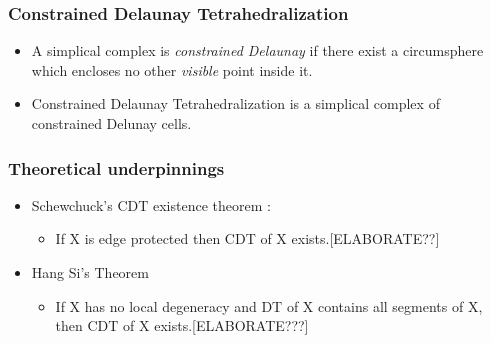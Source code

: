 \documentclass{beamer}
\begin{document}
	\begin{frame}
		\frametitle{Constrained Delaunay Tetrahedralization}
			\begin{itemize}
				\item A simplical complex is \textit{constrained Delaunay} if there exist a circumsphere which encloses no other \textit{visible} point inside it.
				\item Constrained Delaunay Tetrahedralization is a simplical complex of constrained Delunay cells.
			\end{itemize}
	\end{frame}	
	\begin{frame}
		\frametitle{Theoretical underpinnings}
			\begin{itemize}
				\item	Schewchuck's CDT existence theorem \cite{schewCDTExistence}:
					\begin{itemize}
						\item If X is edge protected then CDT of X exists.[ELABORATE??]	
					\end{itemize}		
				\item	Hang Si's Theorem \cite{hangSiMeshingPLCByCDT}
					\begin{itemize}
						\item If X has no local degeneracy and DT of X contains all segments of X, then CDT of X exists.[ELABORATE???] 
					\end{itemize}		
			\end{itemize}		
	\end{frame}	
\end{document}
